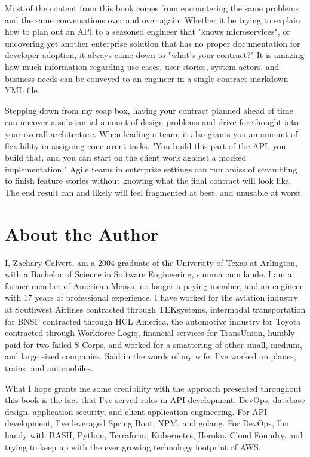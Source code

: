 Most of the content from this book comes from encountering the same problems and the same conversations over and over again.  Whether it be trying to explain how to plan out an API to a seasoned engineer that "knows microservices", or uncovering yet another enterprise solution that has no proper documentation for developer adoption, it always came down to "what's your contract?"  It is amazing how much information regarding use cases, user stories, system actors, and business needs can be conveyed to an engineer in a single contract markdown YML file.

Stepping down from my soap box, having your contract planned ahead of time can uncover a substantial amount of design problems and drive forethought into your overall architecture.  When leading a team, it also grants you an amount of flexibility in assigning concurrent tasks.  "You build this part of the API, you build that, and you can start on the client work against a mocked implementation."  Agile teams in enterprise settings can run amiss of scrambling to finish feature stories without knowing what the final contract will look like.  The end result can and likely will feel fragmented at best, and unusable at worst.

\section*{About the Author}

I, Zachary Calvert, am a 2004 graduate of the University of Texas at Arlington, with a Bachelor of Science in Software Engineering, summa cum laude.  I am a former member of American Mensa, no longer a paying member, and an engineer with 17 years of professional experience.  I have worked for the aviation industry at Southwest Airlines contracted through TEKsystems, intermodal transportation for BNSF contracted through HCL America, the automotive industry for Toyota contracted through Workforce Logiq, financial services for TransUnion, humbly paid for two failed S-Corps, and worked for a smattering of other small, medium, and large sized companies.  Said in the words of my wife, I've worked on planes, trains, and automobiles.

What I hope grants me some credibility with the approach presented throughout this book is the fact that I've served roles in API development, DevOps, database design, application security, and client application engineering.  For API development, I've leveraged Spring Boot, NPM, and golang.  For DevOps, I'm handy with BASH, Python, Terraform, Kubernetes, Heroku, Cloud Foundry, and trying to keep up with the ever growing technology footprint of AWS.

